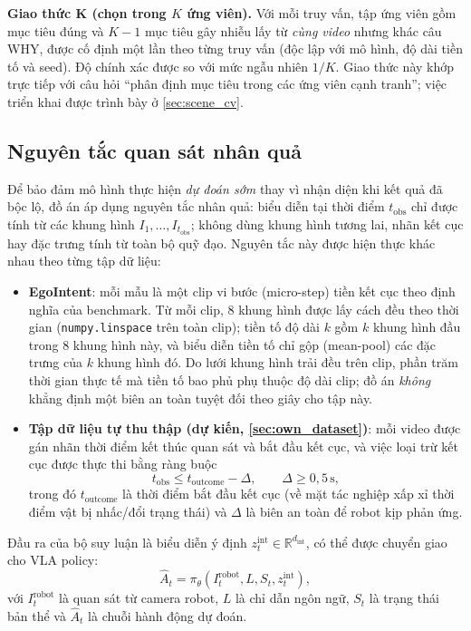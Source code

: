 \documentclass[12pt,a4paper]{report}
\begin{document}
\textbf{Giao thức K (chọn trong $K$ ứng viên).} Với mỗi truy vấn, tập ứng viên gồm mục tiêu đúng và $K-1$ mục tiêu gây nhiễu lấy từ \emph{cùng video} nhưng khác câu WHY, được cố định một lần theo từng truy vấn (độc lập với mô hình, độ dài tiền tố và seed). Độ chính xác được so với mức ngẫu nhiên $1/K$. Giao thức này khớp trực tiếp với câu hỏi ``phân định mục tiêu trong các ứng viên cạnh tranh''; việc triển khai được trình bày ở \cref{sec:scene_cv}.

\subsection{Nguyên tắc quan sát nhân quả}
\label{sec:causal_principle}

Để bảo đảm mô hình thực hiện \emph{dự đoán sớm} thay vì nhận diện khi kết quả đã bộc lộ, đồ án áp dụng nguyên tắc nhân quả: biểu diễn tại thời điểm $t_{\mathrm{obs}}$ chỉ được tính từ các khung hình $I_1,\dots,I_{t_{\mathrm{obs}}}$; không dùng khung hình tương lai, nhãn kết cục hay đặc trưng tính từ toàn bộ quỹ đạo. Nguyên tắc này được hiện thực khác nhau theo từng tập dữ liệu:
\begin{itemize}
    \item \textbf{EgoIntent}: mỗi mẫu là một clip vi bước (micro-step) tiền kết cục theo định nghĩa của benchmark. Từ mỗi clip, 8 khung hình được lấy cách đều theo thời gian (\texttt{numpy.linspace} trên toàn clip); tiền tố độ dài $k$ gồm $k$ khung hình đầu trong 8 khung hình này, và biểu diễn tiền tố chỉ gộp (mean-pool) các đặc trưng của $k$ khung hình đó. Do lưới khung hình trải đều trên clip, phần trăm thời gian thực tế mà tiền tố bao phủ phụ thuộc độ dài clip; đồ án \emph{không} khẳng định một biên an toàn tuyệt đối theo giây cho tập này.
    \item \textbf{Tập dữ liệu tự thu thập (dự kiến, \cref{sec:own_dataset})}: mỗi video được gán nhãn thời điểm kết thúc quan sát và bắt đầu kết cục, và việc loại trừ kết cục được thực thi bằng ràng buộc
    \begin{equation}
        \label{eq:temporal_exclusion_rule}
        t_{\mathrm{obs}} \le t_{\mathrm{outcome}} - \Delta, \qquad \Delta \ge 0{,}5\,\text{s},
    \end{equation}
    trong đó $t_{\mathrm{outcome}}$ là thời điểm bắt đầu kết cục (về mặt tác nghiệp xấp xỉ thời điểm vật bị nhấc/đổi trạng thái) và $\Delta$ là biên an toàn để robot kịp phản ứng.
\end{itemize}

Đầu ra của bộ suy luận là biểu diễn ý định $z_t^{\mathrm{int}} \in \mathbb{R}^{d_{\mathrm{int}}}$, có thể được chuyển giao cho VLA policy:
\begin{equation}
    \label{eq:policy_general}
    \hat{A}_t = \pi_{\theta}\left(I_t^{\mathrm{robot}}, L, S_t, z_t^{\mathrm{int}}\right),
\end{equation}
với $I_t^{\mathrm{robot}}$ là quan sát từ camera robot, $L$ là chỉ dẫn ngôn ngữ, $S_t$ là trạng thái bản thể và $\hat{A}_t$ là chuỗi hành động dự đoán.
\end{document}
